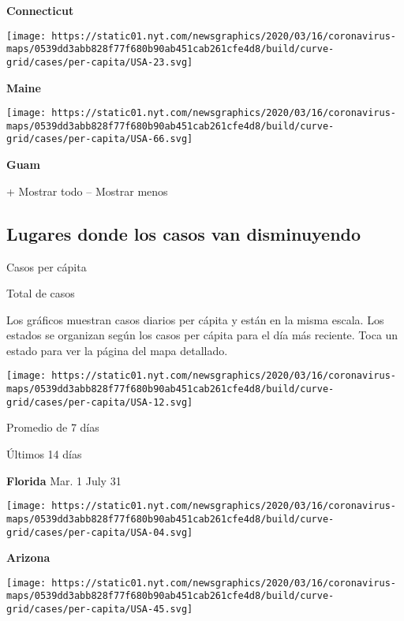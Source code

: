 \textbf{Connecticut}

\href{https://www.nytimes.com/interactive/2020/us/maine-coronavirus-cases.html}{}

\texttt{[image: https://static01.nyt.com/newsgraphics/2020/03/16/coronavirus-maps/0539dd3abb828f77f680b90ab451cab261cfe4d8/build/curve-grid/cases/per-capita/USA-23.svg]}

\textbf{Maine}

\texttt{[image: https://static01.nyt.com/newsgraphics/2020/03/16/coronavirus-maps/0539dd3abb828f77f680b90ab451cab261cfe4d8/build/curve-grid/cases/per-capita/USA-66.svg]}

\textbf{Guam}

+ Mostrar todo -- Mostrar menos

\hypertarget{lugares-donde-los-casos-van-disminuyendo}{%
\subsection{Lugares donde los casos van
disminuyendo}\label{lugares-donde-los-casos-van-disminuyendo}}

Casos per cápita

Total de casos

Los gráficos muestran casos diarios per cápita y están en la misma
escala. Los estados se organizan según los casos per cápita para el día
más reciente. Toca un estado para ver la página del mapa detallado.

\href{https://www.nytimes.com/interactive/2020/us/florida-coronavirus-cases.html}{}

\texttt{[image: https://static01.nyt.com/newsgraphics/2020/03/16/coronavirus-maps/0539dd3abb828f77f680b90ab451cab261cfe4d8/build/curve-grid/cases/per-capita/USA-12.svg]}

Promedio de 7 días

Últimos 14 días

\textbf{Florida} Mar. 1 July 31

\href{https://www.nytimes.com/interactive/2020/us/arizona-coronavirus-cases.html}{}

\texttt{[image: https://static01.nyt.com/newsgraphics/2020/03/16/coronavirus-maps/0539dd3abb828f77f680b90ab451cab261cfe4d8/build/curve-grid/cases/per-capita/USA-04.svg]}

\textbf{Arizona}

\href{https://www.nytimes.com/interactive/2020/us/south-carolina-coronavirus-cases.html}{}

\texttt{[image: https://static01.nyt.com/newsgraphics/2020/03/16/coronavirus-maps/0539dd3abb828f77f680b90ab451cab261cfe4d8/build/curve-grid/cases/per-capita/USA-45.svg]}

